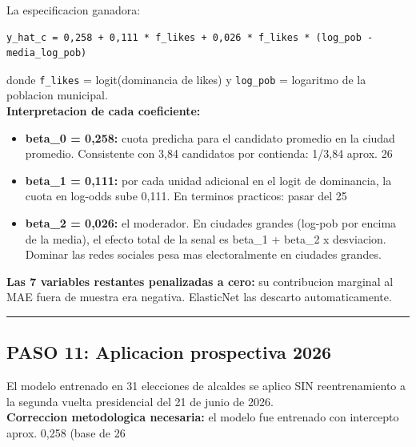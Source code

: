 \documentclass[11pt,a4paper]{article}
\begin{document}
{{La especificacion ganadora:\\[2pt]

\begin{lstlisting}
y_hat_c = 0,258 + 0,111 * f_likes + 0,026 * f_likes * (log_pob - media_log_pob)
\end{lstlisting}

donde \texttt{f_likes} = logit(dominancia de likes) y \texttt{log_pob} = logaritmo de la poblacion municipal.\\[2pt]

\textbf{Interpretacion de cada coeficiente:}\\[2pt]

\begin{itemize}[noitemsep,topsep=2pt]
\item \textbf{beta_0 = 0,258:} cuota predicha para el candidato promedio en la ciudad promedio. Consistente con 3,84 candidatos por contienda: 1/3,84 aprox. 26%
\item \textbf{beta_1 = 0,111:} por cada unidad adicional en el logit de dominancia, la cuota en log-odds sube 0,111. En terminos practicos: pasar del 25%
\item \textbf{beta_2 = 0,026:} el moderador. En ciudades grandes (log-pob por encima de la media), el efecto total de la senal es beta_1 + beta_2 x desviacion. Dominar las redes sociales pesa mas electoralmente en ciudades grandes.
\end{itemize}

\textbf{Las 7 variables restantes penalizadas a cero:} su contribucion marginal al MAE fuera de muestra era negativa. ElasticNet las descarto automaticamente.\\[2pt]

\vspace{4pt}\noindent\rule{\linewidth}{0.4pt}\vspace{4pt}

\subsection{PASO 11: Aplicacion prospectiva 2026}

El modelo entrenado en 31 elecciones de alcaldes se aplico SIN reentrenamiento a la segunda vuelta presidencial del 21 de junio de 2026.\\[2pt]

\textbf{Correccion metodologica necesaria:} el modelo fue entrenado con intercepto aprox. 0,258 (base de 26%

}}
\end{document}
